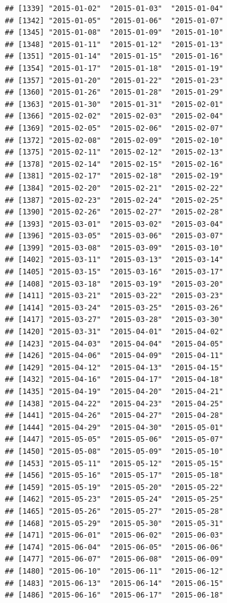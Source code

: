 \documentclass[10pt]{article}\usepackage[]{graphicx}\usepackage[]{color}
\makeatletter
\newenvironment{kframe}{%
 \def\at@end@of@kframe{}%
 \ifinner\ifhmode%
  \def\at@end@of@kframe{\end{minipage}}%
  \begin{minipage}{\columnwidth}%
 \fi\fi%
 \def\FrameCommand##1{\hskip\@totalleftmargin \hskip-\fboxsep
 \colorbox{shadecolor}{##1}\hskip-\fboxsep
     \hskip-\linewidth \hskip-\@totalleftmargin \hskip\columnwidth}%
 \MakeFramed {\advance\hsize-\width
   \@totalleftmargin\z@ \linewidth\hsize
   \@setminipage}}%
 {\par\unskip\endMakeFramed%
 \at@end@of@kframe}
\newenvironment{knitrout}{}{} %
\theoremstyle{plain}
\makeatother
\begin{document}
\begin{knitrout}
\begin{kframe}
\begin{verbatim}
## [1339] "2015-01-02"  "2015-01-03"  "2015-01-04" 
## [1342] "2015-01-05"  "2015-01-06"  "2015-01-07" 
## [1345] "2015-01-08"  "2015-01-09"  "2015-01-10" 
## [1348] "2015-01-11"  "2015-01-12"  "2015-01-13" 
## [1351] "2015-01-14"  "2015-01-15"  "2015-01-16" 
## [1354] "2015-01-17"  "2015-01-18"  "2015-01-19" 
## [1357] "2015-01-20"  "2015-01-22"  "2015-01-23" 
## [1360] "2015-01-26"  "2015-01-28"  "2015-01-29" 
## [1363] "2015-01-30"  "2015-01-31"  "2015-02-01" 
## [1366] "2015-02-02"  "2015-02-03"  "2015-02-04" 
## [1369] "2015-02-05"  "2015-02-06"  "2015-02-07" 
## [1372] "2015-02-08"  "2015-02-09"  "2015-02-10" 
## [1375] "2015-02-11"  "2015-02-12"  "2015-02-13" 
## [1378] "2015-02-14"  "2015-02-15"  "2015-02-16" 
## [1381] "2015-02-17"  "2015-02-18"  "2015-02-19" 
## [1384] "2015-02-20"  "2015-02-21"  "2015-02-22" 
## [1387] "2015-02-23"  "2015-02-24"  "2015-02-25" 
## [1390] "2015-02-26"  "2015-02-27"  "2015-02-28" 
## [1393] "2015-03-01"  "2015-03-02"  "2015-03-04" 
## [1396] "2015-03-05"  "2015-03-06"  "2015-03-07" 
## [1399] "2015-03-08"  "2015-03-09"  "2015-03-10" 
## [1402] "2015-03-11"  "2015-03-13"  "2015-03-14" 
## [1405] "2015-03-15"  "2015-03-16"  "2015-03-17" 
## [1408] "2015-03-18"  "2015-03-19"  "2015-03-20" 
## [1411] "2015-03-21"  "2015-03-22"  "2015-03-23" 
## [1414] "2015-03-24"  "2015-03-25"  "2015-03-26" 
## [1417] "2015-03-27"  "2015-03-28"  "2015-03-30" 
## [1420] "2015-03-31"  "2015-04-01"  "2015-04-02" 
## [1423] "2015-04-03"  "2015-04-04"  "2015-04-05" 
## [1426] "2015-04-06"  "2015-04-09"  "2015-04-11" 
## [1429] "2015-04-12"  "2015-04-13"  "2015-04-15" 
## [1432] "2015-04-16"  "2015-04-17"  "2015-04-18" 
## [1435] "2015-04-19"  "2015-04-20"  "2015-04-21" 
## [1438] "2015-04-22"  "2015-04-23"  "2015-04-25" 
## [1441] "2015-04-26"  "2015-04-27"  "2015-04-28" 
## [1444] "2015-04-29"  "2015-04-30"  "2015-05-01" 
## [1447] "2015-05-05"  "2015-05-06"  "2015-05-07" 
## [1450] "2015-05-08"  "2015-05-09"  "2015-05-10" 
## [1453] "2015-05-11"  "2015-05-12"  "2015-05-15" 
## [1456] "2015-05-16"  "2015-05-17"  "2015-05-18" 
## [1459] "2015-05-19"  "2015-05-20"  "2015-05-22" 
## [1462] "2015-05-23"  "2015-05-24"  "2015-05-25" 
## [1465] "2015-05-26"  "2015-05-27"  "2015-05-28" 
## [1468] "2015-05-29"  "2015-05-30"  "2015-05-31" 
## [1471] "2015-06-01"  "2015-06-02"  "2015-06-03" 
## [1474] "2015-06-04"  "2015-06-05"  "2015-06-06" 
## [1477] "2015-06-07"  "2015-06-08"  "2015-06-09" 
## [1480] "2015-06-10"  "2015-06-11"  "2015-06-12" 
## [1483] "2015-06-13"  "2015-06-14"  "2015-06-15" 
## [1486] "2015-06-16"  "2015-06-17"  "2015-06-18" 

\end{verbatim}
\end{kframe}
\end{knitrout}
\end{document}
